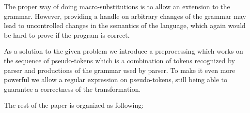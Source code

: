 The proper way of doing macro-substitutions is to allow an
extension to the grammar.  However, providing a handle on
arbitrary changes of the grammar may lead to uncontrolled 
changes in the semantics of the language, which again would
be hard to prove if the program is correct.

As a solution to the given problem we introduce a preprocessing
which works on the sequence of pseudo-tokens which is a combination
of tokens recognized by parser and productions of the grammar
used by parser.  To make it even more powerful we allow a 
regular expression on pseudo-tokens, still being able to 
guarantee a correctness of the transformation.

The rest of the paper is organized as following:



